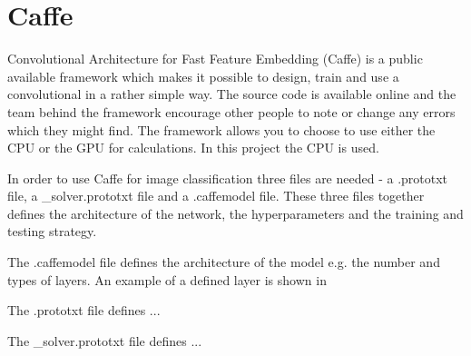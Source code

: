 \graphicspath{{Chapters/Project/}}

\section{Caffe} %
\label{sec:caffe}

Convolutional Architecture for Fast Feature Embedding (Caffe) is a public available framework which makes it possible to design, train and use a convolutional in a rather simple way. The source code is available online and the team behind the framework encourage other people to note or change any errors which they might find. The framework allows you to choose to use either the CPU or the GPU for calculations. In this project the CPU is used.



In order to use Caffe for image classification three files are needed - a .prototxt file, a \_solver.prototxt file and a .caffemodel file. These three files together defines the architecture of the network, the hyperparameters and the training and testing strategy.

The .caffemodel file defines the architecture of the model e.g. the number and types of layers. An example of a defined layer is shown in

The .prototxt file defines ...

The \_solver.prototxt file defines ...


